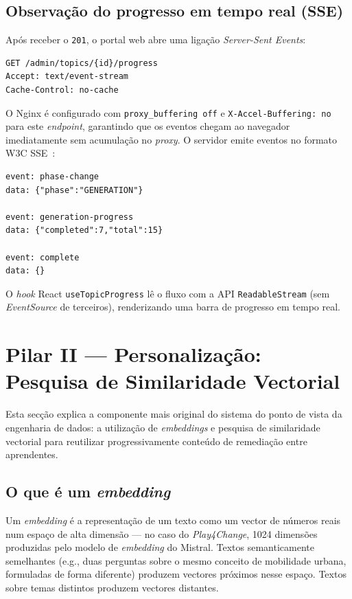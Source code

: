 \subsection*{Observação do progresso em tempo real (SSE)}

Após receber o \texttt{201}, o portal web abre uma ligação
\textit{Server-Sent Events}:

\begin{verbatim}
GET /admin/topics/{id}/progress
Accept: text/event-stream
Cache-Control: no-cache
\end{verbatim}

O Nginx é configurado com \texttt{proxy\_buffering off} e
\texttt{X-Accel-Buffering: no} para este \textit{endpoint}, garantindo
que os eventos chegam ao navegador imediatamente sem acumulação no
\textit{proxy}.
O servidor emite eventos no formato W3C SSE~\cite{w3c2021sse}:

\begin{verbatim}
event: phase-change
data: {"phase":"GENERATION"}

event: generation-progress
data: {"completed":7,"total":15}

event: complete
data: {}
\end{verbatim}

O \textit{hook} React \texttt{useTopicProgress} lê o fluxo com a API
\texttt{ReadableStream} (sem \textit{EventSource} de terceiros),
renderizando uma barra de progresso em tempo real.

\section{Pilar II — Personalização: Pesquisa de Similaridade Vectorial}
\label{sec:pgvector}

Esta secção explica a componente mais original do sistema do ponto de vista
da engenharia de dados: a utilização de \textit{embeddings} e pesquisa de
similaridade vectorial para reutilizar progressivamente conteúdo de
remediação entre aprendentes.

\subsection*{O que é um \textit{embedding}}

Um \textit{embedding} é a representação de um texto como um vector de
números reais num espaço de alta dimensão — no caso do \textit{Play4Change},
1024 dimensões produzidas pelo modelo de \textit{embedding} do Mistral.
Textos semanticamente semelhantes (e.g., duas perguntas sobre o mesmo
conceito de mobilidade urbana, formuladas de forma diferente) produzem
vectores próximos nesse espaço.
Textos sobre temas distintos produzem vectores distantes.

